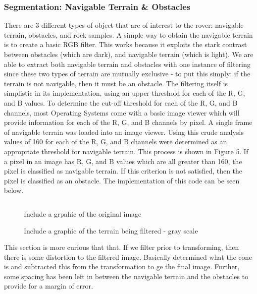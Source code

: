 \documentclass[a4paper]{article}
\begin{document}
\subsubsection{Segmentation: Navigable Terrain \& Obstacles}
There are 3 different types of object that are of interest to the rover: navigable terrain, obstacles, and rock samples. A simple way to obtain the navigable terrain is to create a basic RGB filter. This works because it exploits the stark contrast between obstacles (which are dark), and navigable terrain (which is light). We are able to extract both navigable terrain and obstacles with one instance of filtering since these two types of terrain are mutually exclusive - to put this simply: if the terrain is not navigable, then it must be an obstacle. The filtering itself is simplistic in its implementation, using an upper threshold for each of the R, G, and B values. To determine the cut-off threshold for each of the R, G, and B channels, most Operating Systems come with a basic image viewer which will provide information for each of the R, G, and B channels by pixel. A single frame of navigable terrain was loaded into an image viewer. Using this crude analysis values of 160 for each of the R, G, and B channels were determined as an appropriate threshold for navigable terrain. This process is shown in Figure 5. If a pixel in an image has R, G, and B values which are all greater than 160, the pixel is classified as navigable terrain. If this criterion is not satisfied, then the pixel is classified as an obstacle. The implementation of this code can be seen below.

\begin{lstlisting}[language=Python]

\end{lstlisting}

\begin{figure}
\begin{minipage}{0.45\linewidth}
\centering
\caption{Include a grpahic of the original image}
\end{minipage}
\begin{minipage}{0.45\linewidth}
\centering
\caption{Include a graphic of the terrain being filtered - gray scale}
\end{minipage}
\end{figure}

This section is more curious that that. If we filter prior to transforming, then there is some distortion to the filtered image. Basically determined what the cone is and subtracted this from the transformation to ge the final image. Further, some spacing has been left in between the navigable terrain and the obstacles to provide for a margin of error.
\end{document}
